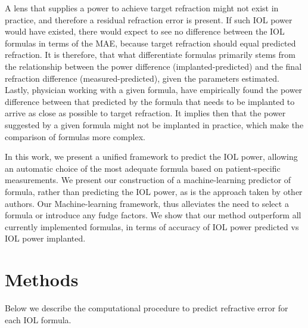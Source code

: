 \documentclass[article,twocolumn,preprint,10pt]{paper}%
\renewcommand{\(}{\left(}
\renewcommand{\)}{\right)}
\renewcommand{\[}{\left[}
\renewcommand{\]}{\right]}
\newcommand{\1}{\mbox{\boldmath$1$}}
\begin{document}
A lens that supplies a power to achieve target refraction might not exist in practice, and therefore a residual refraction error is present. If such IOL power would have existed, there would expect to see no difference between the IOL formulas in terms of the MAE, because target refraction should equal predicted refraction. It is therefore, that what differentiate formulas primarily stems from the relationship between the power difference (implanted-predicted) and the final refraction difference (measured-predicted), given the parameters estimated. Lastly, physician working with a given formula, have empirically found the power difference between that predicted by the formula that needs to be implanted to arrive as close as possible to target refraction. It implies then that the power suggested by a given formula might not be implanted in practice, which make the comparison of formulas more complex. 

In this work, we present a unified framework to predict the IOL power, allowing an automatic choice of the most adequate formula based on patient-specific measurements. We present our construction of a machine-learning predictor of formula, rather than predicting the IOL power, as is the approach taken by other authors. Our Machine-learning framework, thus alleviates the need to select a formula or introduce any fudge factors. We show that our method outperform all currently implemented formulas, in terms of accuracy of IOL power predicted vs IOL power implanted. 

\section{Methods}\label{section:Methods}
Below we describe the computational procedure to predict refractive error for each IOL formula. 
\end{document}
